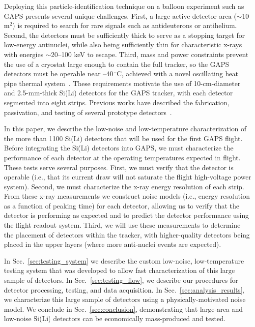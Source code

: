 \documentclass[journal]{IEEEtran}
\begin{document}
%
\par Deploying this particle-identification technique on a balloon experiment such as GAPS presents several unique challenges. First, a large active detector area (${\sim}$10 m$^2$) is required to search for rare signals such as antideuterons or antihelium. Second, the detectors must be sufficiently thick to serve as a stopping target for low-energy antinuclei, while also being sufficiently thin for characteristic x-rays with energies ${\sim}$20--100 keV to escape. Third, mass and power constraints prevent the use of a cryostat large enough to contain the full tracker, so the GAPS detectors must be operable near --40$\,^\circ\text{C}$, achieved with a novel oscillating heat pipe thermal system~\cite{HideyukiFUKE2016,OKAZAKI201820}. These requirements motivate the use of 10-cm-diameter and 2.5-mm-thick Si(Li) detectors for the GAPS tracker, with each detector segmented into eight strips. Previous works have described the fabrication, passivation, and testing of several prototype detectors~\cite{Perez:2018akh,Kozai:2019xlp,Rogers:2019avj,Kozai:2021apo,Saffold:2021uqx}. 
%
\par In this paper, we describe the low-noise and low-temperature characterization of the more than 1100 Si(Li) detectors that will be used for the first GAPS flight. Before integrating the Si(Li) detectors into GAPS, we must characterize the performance of each detector at the operating temperatures expected in flight. These tests serve several purposes. First, we must verify that the detector is operable (i.e., that its current draw will not saturate the flight high-voltage power system). Second, we must characterize the x-ray energy resolution of each strip. From these x-ray measurements we construct noise models (i.e., energy resolution as a function of peaking time) for each detector, allowing us to verify that the detector is performing as expected and to predict the detector performance using the flight readout system. Third, we will use these measurements to determine the placement of detectors within the tracker, with higher-quality detectors being placed in the upper layers (where more anti-nuclei events are expected).  
%
\par In Sec.~\ref{sec:testing_system} we describe the custom low-noise, low-temperature testing system that was developed to allow fast characterization of this large sample of detectors. In Sec.~\ref{sec:testing_flow}, we describe our procedures for detector processing, testing, and data acquisition. In Sec.~\ref{sec:analysis_results}, we characterize this large sample of detectors using a physically-motivated noise model. We conclude in Sec.~\ref{sec:conclusion}, demonstrating that large-area and low-noise Si(Li) detectors can be economically mass-produced and tested. 
\end{document}
